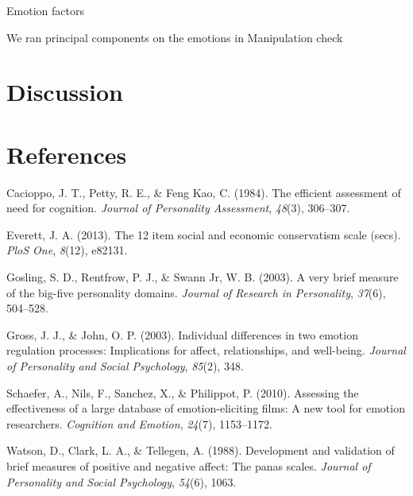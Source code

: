 \documentclass[man,draftall]{apa6}
\begin{document}
Emotion factors

We ran principal components on the emotions in Manipulation check

\section{Discussion}\label{discussion}

\newpage

\section{References}\label{references}

\begingroup
\setlength{\parindent}{-0.5in} \setlength{\leftskip}{0.5in}

\hypertarget{refs}{}
\hypertarget{ref-cacioppo1984}{}
Cacioppo, J. T., Petty, R. E., \& Feng Kao, C. (1984). The efficient
assessment of need for cognition. \emph{Journal of Personality
Assessment}, \emph{48}(3), 306--307.

\hypertarget{ref-everett2013}{}
Everett, J. A. (2013). The 12 item social and economic conservatism
scale (secs). \emph{PloS One}, \emph{8}(12), e82131.

\hypertarget{ref-gosling2003}{}
Gosling, S. D., Rentfrow, P. J., \& Swann Jr, W. B. (2003). A very brief
measure of the big-five personality domains. \emph{Journal of Research
in Personality}, \emph{37}(6), 504--528.

\hypertarget{ref-gross2003}{}
Gross, J. J., \& John, O. P. (2003). Individual differences in two
emotion regulation processes: Implications for affect, relationships,
and well-being. \emph{Journal of Personality and Social Psychology},
\emph{85}(2), 348.

\hypertarget{ref-schaefer2010}{}
Schaefer, A., Nils, F., Sanchez, X., \& Philippot, P. (2010). Assessing
the effectiveness of a large database of emotion-eliciting films: A new
tool for emotion researchers. \emph{Cognition and Emotion},
\emph{24}(7), 1153--1172.

\hypertarget{ref-watson1988}{}
Watson, D., Clark, L. A., \& Tellegen, A. (1988). Development and
validation of brief measures of positive and negative affect: The panas
scales. \emph{Journal of Personality and Social Psychology},
\emph{54}(6), 1063.

\endgroup
\end{document}
